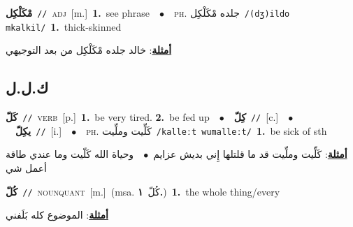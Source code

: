 \documentclass[10pt,a4paper,twoside]{article} %
\begin{document}
\begin{multicols}{2}
{\setlength\topsep{0pt}\textbf{\foreignlanguage{arabic}{مْكَلْكِل}}\ {\color{gray}\texttt{//}\color{black}}\ \textsc{adj}\ [m.]\ \textbf{1.}~see phrase\ \ $\bullet$\ \ \textsc{ph.} \color{gray} \foreignlanguage{arabic}{جلده مْكَلْكِل}\color{black}\ {\color{gray}\texttt{/{\sffamily (dʒ)ildo mkalkil}/}\color{black}}\ \textbf{1.}~thick-skinned\  \begin{flushright}\color{gray}\foreignlanguage{arabic}{\textbf{\underline{\foreignlanguage{arabic}{أمثلة}}}: خالد جلده مْكَلْكِل من بعد التوجيهي}\end{flushright}\color{black}} \vspace{2mm}

\vspace{-3mm}
\subsection*{\color{blue}\foreignlanguage{arabic}{ك.ل.ل}\color{blue}{}} 

{\setlength\topsep{0pt}\textbf{\foreignlanguage{arabic}{كَلّ}}\ {\color{gray}\texttt{//}\color{black}}\ \textsc{verb}\ [p.]\ \textbf{1.}~be very tired.  \textbf{2.}~be fed up\ \ $\bullet$\ \ \setlength\topsep{0pt}\textbf{\foreignlanguage{arabic}{كِلّ}}\ {\color{gray}\texttt{//}\color{black}}\ [c.]\ \ $\bullet$\ \ \setlength\topsep{0pt}\textbf{\foreignlanguage{arabic}{يكِلّ}}\ {\color{gray}\texttt{//}\color{black}}\ [i.]\ \ $\bullet$\ \ \textsc{ph.} \color{gray} \foreignlanguage{arabic}{كَلِّيت وملِّيت}\color{black}\ {\color{gray}\texttt{/{\sffamily kalleːt wumalleːt}/}\color{black}}\ \textbf{1.}~be sick of sth\  \begin{flushright}\color{gray}\foreignlanguage{arabic}{\textbf{\underline{\foreignlanguage{arabic}{أمثلة}}}: كَلِّيت وملِّيت قد ما قلتلها إِني بديش عزايم\ $\bullet$\ \  وحياة الله كَلّيت وما عندي طاقة أعمل شي}\end{flushright}\color{black}} \vspace{2mm}

{\setlength\topsep{0pt}\textbf{\foreignlanguage{arabic}{كُلّ}}\ {\color{gray}\texttt{//}\color{black}}\ \textsc{noun\textunderscore quant}\ [m.]\ \color{gray}(msa. \foreignlanguage{arabic}{كُلّ}~\foreignlanguage{arabic}{\textbf{١.}})\color{black}\ \textbf{1.}~the whole thing/every\  \begin{flushright}\color{gray}\foreignlanguage{arabic}{\textbf{\underline{\foreignlanguage{arabic}{أمثلة}}}: الموضوع كله بَلَفني}\end{flushright}\color{black}} \vspace{2mm}


\end{multicols}
\end{document}
